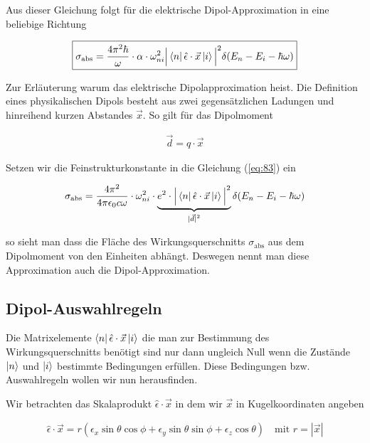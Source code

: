 Aus dieser Gleichung folgt für die elektrische Dipol-Approximation in eine beliebige Richtung

\begin{align}
  \label{eq:83}
 \boxed{ \sigma_{\text{abs}}  = \frac{4 \pi^2 \hbar }{ \omega} \cdot \alpha \cdot \omega_{ni}^2  \Big|\left\langle n \right|\hat \epsilon \cdot \vec x\left| i \right\rangle\Big|^2 \delta(E_n - E_i - \hbar\omega) }
\end{align}

Zur Erläuterung warum das elektrische Dipolapproximation heist. Die Definition eines physikalischen Dipols besteht aus zwei gegensätzlichen Ladungen und hinreihend kurzen Abstandes \(\vec x\). So gilt für das Dipolmoment

\begin{align}
  \label{eq:84}
  \vec d = q\cdot\vec x
\end{align}

Setzen wir die Feinstrukturkonstante in die Gleichung (\ref{eq:83}) ein

\begin{align}
  \label{eq:85}
  \sigma_{\text{abs}}  = \frac{4 \pi^2 }{4\pi \epsilon_0 c \omega} \cdot  \omega_{ni}^2 \cdot\underbr{ e^2\cdot \Big|\bra{n}\hat \epsilon \cdot \vec x\ket{i}\Big|^2}_{|\vec d|^2} \delta(E_n - E_i - \hbar\omega) 
\end{align}

so sieht man dass die Fläche des Wirkungsquerschnitts \( \sigma_{\text{abs}} \) aus dem Dipolmoment von den Einheiten abhängt. Deswegen nennt man diese Approximation auch die Dipol-Approximation. 


\subsection*{Dipol-Auswahlregeln}

Die Matrixelemente \(\left\langle n \right|\hat \epsilon \cdot \vec x\left| i \right\rangle\) die man zur Bestimmung des Wirkungsquerschnitts benötigt sind nur dann ungleich Null wenn die Zustände \(\left| n \right\rangle\) und \(\left| i \right\rangle\) bestimmte Bedingungen erfüllen. Diese Bedingungen bzw. Auswahlregeln wollen wir nun herausfinden.

Wir betrachten das Skalaprodukt \(\hat \epsilon \cdot \vec x\) in dem wir \(\vec x\) in Kugelkoordinaten angeben

\begin{align}
  \label{eq:86}
  \hat \epsilon \cdot \vec x = r (\epsilon_x \sin\theta \cos\phi + \epsilon_y \sin\theta \sin\phi + \epsilon_z\cos\theta) \quad \text{mit }r = |\vec x|
\end{align}

